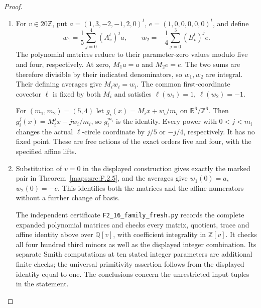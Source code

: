 \begin{proof}
\begin{enumerate}[label=\arabic*.]
\item For $v\in20\mathbb Z$, put
$a=(1,3,-2,-1,2,0)^t$, $e=(1,0,0,0,0,0)^t$, and define
\[
 w_1=\frac15\sum_{j=0}^4(A_v^t)^j a,
 \qquad
 w_2=-\frac14\sum_{j=0}^3(B_v^t)^j e.
 \tag{F.U7}\label{maps:eq:F.U7}
\]
The polynomial matrices reduce to their parameter-zero
values modulo five and four, respectively. At zero,
$M_1a=a$ and $M_2e=e$. The two sums are therefore divisible
by their indicated denominators, so $w_1,w_2$ are integral.
Their defining averages give $M_iw_i=w_i$. The common
first-coordinate covector $\ell$ is fixed by both $M_i$ and
satisfies $\ell(w_1)=1$, $\ell(w_2)=-1$.

For $(m_1,m_2)=(5,4)$ let
$g_i(x)=M_ix+w_i/m_i$ on $\mathbb R^6/\mathbb Z^6$.
Then $g_i^j(x)=M_i^jx+jw_i/m_i$, so $g_i^{m_i}$ is the
identity. Every power with $0<j<m_i$ changes the actual
$\ell$-circle coordinate by $j/5$ or $-j/4$, respectively.
It has no fixed point. These are free actions of the exact
orders five and four, with the specified affine lifts.

\item Substitution of $v=0$ in the displayed construction gives
exactly the marked pair in Theorem~\ref{maps:src:F.2.5}, and
the averages give $w_1(0)=a$, $w_2(0)=-e$. This identifies
both the matrices and the affine numerators without a further
change of basis.

The independent certificate
\texttt{F2\_16\_family\_fresh.py} records the complete expanded
polynomial matrices and checks every matrix, quotient, trace
and affine identity above over $\mathbb Q[v]$, with coefficient
integrality in $\mathbb Z[v]$. It checks all four hundred
third minors as well as the displayed integer combination.
Its separate Smith computations at ten stated integer
parameters are additional finite checks; the universal
primitivity assertion follows from the displayed identity
equal to one. The conclusions concern the unrestricted
input tuples in the statement.
\end{enumerate}
\end{proof}




